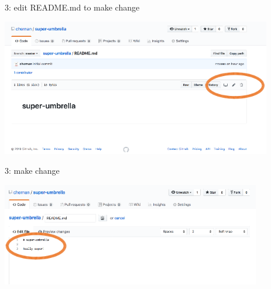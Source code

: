 \begin{frame}{ }
\begin{exampleblock}{3: edit README.md to make change}
    \begin{center}
    \includegraphics[height=6cm]{05_history/Images/FAIR_githubTP_edit.png}
    \end{center}
\end{exampleblock}
\end{frame}
\begin{frame}{ }
\begin{exampleblock}{3: make change}
    \begin{center}
    \includegraphics[height=4.5cm]{05_history/Images/FAIR_githubTP_editing.png}
    \end{center}
\end{exampleblock}
\end{frame}
